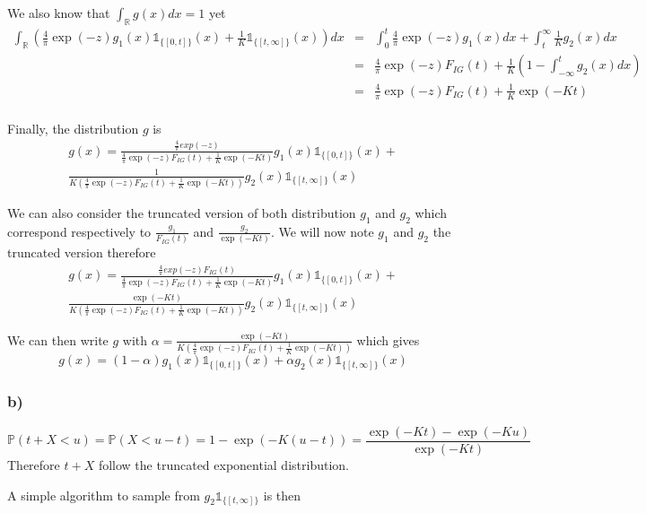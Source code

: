We also know that $\int_{\mathbb{R}} g(x)dx = 1$ yet
\begin{eqnarray*}
	\int_{\mathbb{R}}\left(\frac{4}{\pi}\exp(-z) g_1(x) \mathbb{1}_{\{[0,t]\}}(x)+ \frac{1}{K}\mathbb{1}_{\{[t,\infty]\}}(x)\right)dx &=& \int_{0}^t \frac{4}{\pi}\exp(-z) g_1(x)dx + \int_t^\infty \frac{1}{K}g_2(x)dx\\
	&=& \frac{4}{\pi} \exp(-z) F_{IG}(t) + \frac{1}{K} (1 - \int_{-\infty}^t g_2(x)dx)\\
	&=& \frac{4}{\pi} \exp(-z) F_{IG}(t) + \frac{1}{K} \exp(-Kt)\\
\end{eqnarray*}

Finally, the distribution $g$ is 
\begin{eqnarray*}
	g(x) = \frac{\frac{4}{\pi}exp(-z)}{\frac{4}{\pi} \exp(-z) F_{IG}(t) + \frac{1}{K} \exp(-Kt)}g_1(x) \mathbb{1}_{\{[0,t]\}}(x)+\\ \frac{1}{K(\frac{4}{\pi} \exp(-z) F_{IG}(t) + \frac{1}{K} \exp(-Kt))} g_2(x) \mathbb{1}_{\{[t,\infty]\}}(x)
\end{eqnarray*}


We can also consider the truncated version of both distribution $g_1$ and $g_2$ which correspond respectively to $\frac{g_1}{F_{IG}(t)}$ and $\frac{g_2}{\exp(-Kt)}$. We will now note $g_1$ and $g_2$ the truncated version therefore
\begin{eqnarray*}
	g(x) = \frac{\frac{4}{\pi}exp(-z)F_{IG}(t)}{\frac{4}{\pi} \exp(-z) F_{IG}(t) + \frac{1}{K} \exp(-Kt)}g_1(x) \mathbb{1}_{\{[0,t]\}}(x)+\\ \frac{\exp(-Kt)}{K(\frac{4}{\pi} \exp(-z) F_{IG}(t) + \frac{1}{K} \exp(-Kt))} g_2(x) \mathbb{1}_{\{[t,\infty]\}}(x)
\end{eqnarray*}


We can then write $g$ with $\alpha = \frac{\exp(-Kt)}{K(\frac{4}{\pi} \exp(-z) F_{IG}(t) + \frac{1}{K} \exp(-Kt))}$ which gives
\[g(x) = (1-\alpha) g_1(x)  \mathbb{1}_{\{[0,t]\}}(x) + \alpha g_2(x)  \mathbb{1}_{\{[t,\infty]\}}(x)\]

\subsubsection*{b)}

\[\mathbb{P}(t + X < u) = \mathbb{P}(X < u-t) = 1 - \exp(-K(u-t)) = \frac{\exp(-Kt) - \exp(-Ku)}{\exp(-Kt)}\]
Therefore $t + X$ follow the truncated exponential distribution.


A simple algorithm to sample from $g_2\mathbb{1}_{\{[t,\infty]\}}$ is then 


